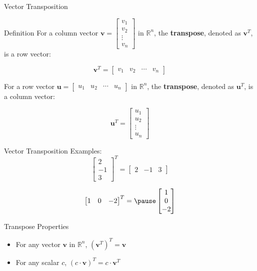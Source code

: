 \documentclass{beamer}
\begin{document}
\begin{frame}{Vector Transposition}
  \begin{block}{Definition}
    For a column vector \( \mathbf{v} = \begin{bmatrix} v_1 \\ v_2 \\ \vdots \\ v_n \end{bmatrix} \) in \( \mathbb{R}^n \), the \textbf{transpose}, denoted as \( \mathbf{v}^T \), is a row vector:
    
    \[
    \mathbf{v}^T = \begin{bmatrix} v_1 & v_2 & \cdots & v_n \end{bmatrix}
    \]
    
    \pause For a row vector \( \mathbf{u} = \begin{bmatrix} u_1 & u_2 & \cdots & u_n \end{bmatrix} \) in \( \mathbb{R}^n \), the \textbf{transpose}, denoted as \( \mathbf{u}^T \), is a column vector:
    
    \[
    \mathbf{u}^T = \begin{bmatrix} u_1 \\ u_2 \\ \vdots \\ u_n \end{bmatrix}
    \]
  \end{block}

\end{frame}


\begin{frame}{Vector Transposition}
  Examples:
    \[
    \begin{bmatrix} 2 \\ -1 \\ 3 \end{bmatrix}^T = \begin{bmatrix} 2 & -1 & 3 \end{bmatrix}
    \]
    
   \pause \[
    \begin{bmatrix} 1 & 0 & -2 \end{bmatrix}^T =\pause \begin{bmatrix} 1 \\ 0 \\ -2 \end{bmatrix}
    \]
  
  \pause\begin{block}{Transpose Properties}
    \begin{itemize}
      \item For any vector \( \mathbf{v} \) in \( \mathbb{R}^n \), \( (\mathbf{v}^T)^T = \mathbf{v} \)
      \item For any scalar \( c \), \( (c \cdot \mathbf{v})^T = c \cdot \mathbf{v}^T \)
    \end{itemize}
  \end{block}

\end{frame}
\end{document}
